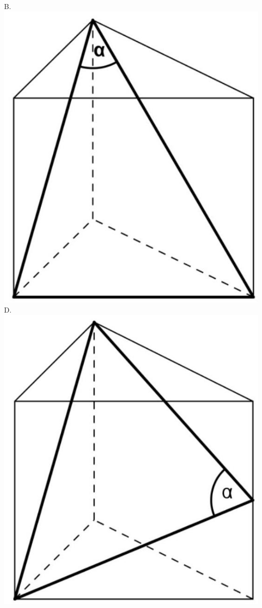 \documentclass[10pt]{article}
\begin{document}
B.\\
\includegraphics[max width=\textwidth, center]{2024_11_21_94f02db55673a8a7b820g-08(3)}\\
D.\\
\includegraphics[max width=\textwidth, center]{2024_11_21_94f02db55673a8a7b820g-08}
\end{document}
